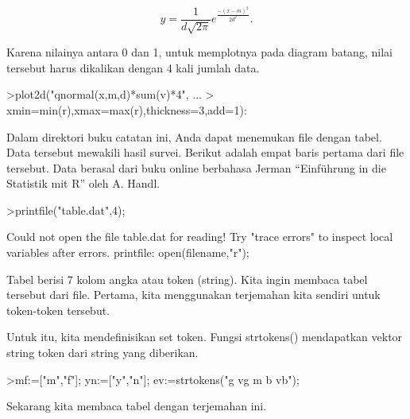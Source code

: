 \documentclass[a4paper,10pt]{article}
\begin{document}
\begin{eulernotebook}
\begin{eulercomment}
\begin{eulercomment}
\begin{eulercomment}
\begin{eulercomment}
\begin{eulercomment}
\begin{eulercomment}
\begin{eulercomment}
\begin{eulercomment}
\begin{eulercomment}
\begin{eulercomment}
\begin{eulercomment}
\begin{eulercomment}
\begin{eulercomment}
\begin{eulercomment}
\begin{eulercomment}
\begin{eulercomment}
\begin{eulercomment}
\begin{eulercomment}
\begin{eulercomment}
\end{eulercomment}
\begin{eulerformula}
\[
y=\frac{1}{d\sqrt{2\pi}}e^{\frac{-(x-m)^2}{2d^2}}.
\]
\end{eulerformula}
\begin{eulercomment}
Karena nilainya antara 0 dan 1, untuk memplotnya pada diagram batang,
nilai tersebut harus dikalikan dengan 4 kali jumlah data.
\end{eulercomment}
\begin{eulerprompt}
>plot2d("qnormal(x,m,d)*sum(v)*4", ...
>  xmin=min(r),xmax=max(r),thickness=3,add=1):
\end{eulerprompt}
\begin{eulercomment}
Dalam direktori buku catatan ini, Anda dapat menemukan file dengan
tabel. Data tersebut mewakili hasil survei. Berikut adalah empat baris
pertama dari file tersebut. Data berasal dari buku online berbahasa
Jerman “Einführung in die Statistik mit R” oleh A. Handl.
\end{eulercomment}
\begin{eulerprompt}
>printfile("table.dat",4);
\end{eulerprompt}
\begin{euleroutput}
  Could not open the file
  table.dat
  for reading!
  Try "trace errors" to inspect local variables after errors.
  printfile:
      open(filename,"r");
\end{euleroutput}
\begin{eulercomment}
Tabel berisi 7 kolom angka atau token (string). Kita ingin membaca
tabel tersebut dari file. Pertama, kita menggunakan terjemahan kita
sendiri untuk token-token tersebut.

Untuk itu, kita mendefinisikan set token. Fungsi strtokens()
mendapatkan vektor string token dari string yang diberikan.
\end{eulercomment}
\begin{eulerprompt}
>mf:=["m","f"]; yn:=["y","n"]; ev:=strtokens("g vg m b vb");
\end{eulerprompt}
\begin{eulercomment}
Sekarang kita membaca tabel dengan terjemahan ini.


\end{eulercomment}
\end{eulercomment}
\end{eulercomment}
\end{eulercomment}
\end{eulercomment}
\end{eulercomment}
\end{eulercomment}
\end{eulercomment}
\end{eulercomment}
\end{eulercomment}
\end{eulercomment}
\end{eulercomment}
\end{eulercomment}
\end{eulercomment}
\end{eulercomment}
\end{eulercomment}
\end{eulercomment}
\end{eulercomment}
\end{eulercomment}
\end{eulernotebook}
\end{document}
